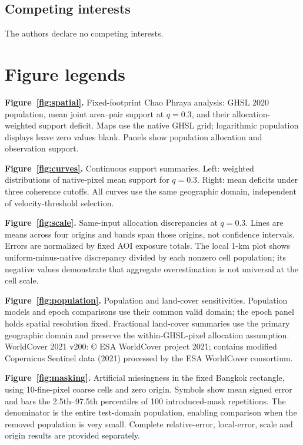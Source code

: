 \documentclass[pdflatex,lineno,sn-nature]{sn-jnl}
\begin{document}
\subsection*{Competing interests}
The authors declare no competing interests.
\section*{Figure legends}

\noindent\textbf{Figure~\ref{fig:spatial}.} Fixed-footprint Chao Phraya analysis: GHSL 2020 population, mean joint area--pair support at $q=0.3$, and their allocation-weighted support deficit. Maps use the native GHSL grid; logarithmic population displays leave zero values blank. Panels show population allocation and observation support.

\noindent\textbf{Figure~\ref{fig:curves}.} Continuous support summaries. Left: weighted distributions of native-pixel mean support for $q=0.3$. Right: mean deficits under three coherence cutoffs. All curves use the same geographic domain, independent of velocity-threshold selection.

\noindent\textbf{Figure~\ref{fig:scale}.} Same-input allocation discrepancies at $q=0.3$. Lines are means across four origins and bands span those origins, not confidence intervals. Errors are normalized by fixed AOI exposure totals. The local 1-km plot shows uniform-minus-native discrepancy divided by each nonzero cell population; its negative values demonstrate that aggregate overestimation is not universal at the cell scale.

\noindent\textbf{Figure~\ref{fig:population}.} Population and land-cover sensitivities. Population models and epoch comparisons use their common valid domain; the epoch panel holds spatial resolution fixed. Fractional land-cover summaries use the primary geographic domain and preserve the within-GHSL-pixel allocation assumption. WorldCover 2021 v200: \copyright{} ESA WorldCover project 2021; contains modified Copernicus Sentinel data (2021) processed by the ESA WorldCover consortium.

\noindent\textbf{Figure~\ref{fig:masking}.} Artificial missingness in the fixed Bangkok rectangle, using 10-fine-pixel coarse cells and zero origin. Symbols show mean signed error and bars the 2.5th--97.5th percentiles of 100 introduced-mask repetitions. The denominator is the entire test-domain population, enabling comparison when the removed population is very small. Complete relative-error, local-error, scale and origin results are provided separately.
\end{document}

